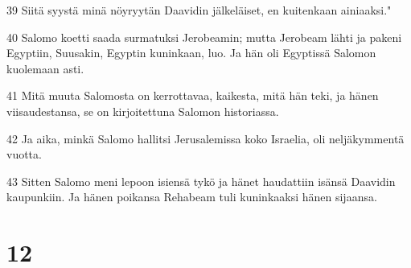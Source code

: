 \par 39 Siitä syystä minä nöyryytän Daavidin jälkeläiset, en kuitenkaan ainiaaksi."
\par 40 Salomo koetti saada surmatuksi Jerobeamin; mutta Jerobeam lähti ja pakeni Egyptiin, Suusakin, Egyptin kuninkaan, luo. Ja hän oli Egyptissä Salomon kuolemaan asti.
\par 41 Mitä muuta Salomosta on kerrottavaa, kaikesta, mitä hän teki, ja hänen viisaudestansa, se on kirjoitettuna Salomon historiassa.
\par 42 Ja aika, minkä Salomo hallitsi Jerusalemissa koko Israelia, oli neljäkymmentä vuotta.
\par 43 Sitten Salomo meni lepoon isiensä tykö ja hänet haudattiin isänsä Daavidin kaupunkiin. Ja hänen poikansa Rehabeam tuli kuninkaaksi hänen sijaansa.

\chapter{12}

